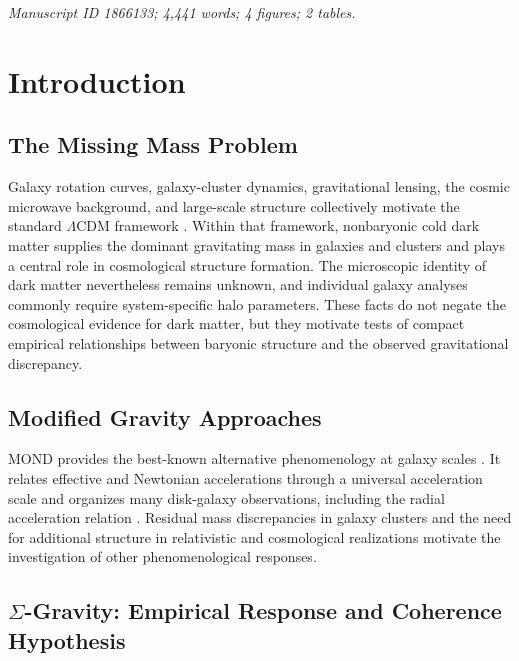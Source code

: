 \documentclass[aps,prd,reprint,superscriptaddress,showpacs,floatfix,longbibliography]{revtex4-2}
\begin{document}
\maketitle

\noindent\textit{Manuscript ID 1866133; 4,441 words; 4 figures; 2 tables.}

\section{Introduction}

\subsection{The Missing Mass Problem}

Galaxy rotation curves, galaxy-cluster dynamics, gravitational lensing, the cosmic microwave background, and large-scale structure collectively motivate the standard $\Lambda$CDM framework \cite{ref1,ref2}. Within that framework, nonbaryonic cold dark matter supplies the dominant gravitating mass in galaxies and clusters and plays a central role in cosmological structure formation. The microscopic identity of dark matter nevertheless remains unknown, and individual galaxy analyses commonly require system-specific halo parameters. These facts do not negate the cosmological evidence for dark matter, but they motivate tests of compact empirical relationships between baryonic structure and the observed gravitational discrepancy.

\subsection{Modified Gravity Approaches}

MOND provides the best-known alternative phenomenology at galaxy scales \cite{ref3,ref4}. It relates effective and Newtonian accelerations through a universal acceleration scale and organizes many disk-galaxy observations, including the radial acceleration relation \cite{ref5}. Residual mass discrepancies in galaxy clusters and the need for additional structure in relativistic and cosmological realizations motivate the investigation of other phenomenological responses.

\subsection{$\Sigma$-Gravity: Empirical Response and Coherence Hypothesis}
\end{document}
